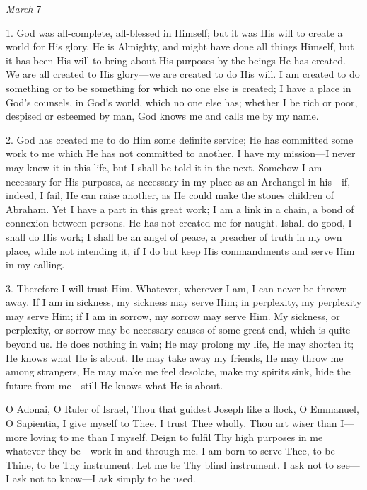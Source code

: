 
\emph{March}
7

1. God was all-complete,
all-blessed in Himself; but it was His will to create a world for His
glory. He is Almighty, and might have done all things Himself, but it
has been His will to bring about His purposes by the beings He has
created. We are all created to His glory—we are created to do
His will. I am created to do something or to be something for which no
one else is created; I have a place in God's counsels, in God's world,
which no one else has; whether I be rich or poor, despised or esteemed
by man, God knows me and calls me by my name.

2. God has created me to do Him
some definite service; He has committed some work to me which He has not
committed to another. I have my mission—I never may know it in this
life, but I shall be told it in the next. Somehow I am necessary for His
purposes, as necessary in my place as an Archangel in his—if, indeed,
I fail, He can raise another, as He could make the stones children of
Abraham. Yet I have a part in this great work; I am a link in a chain, a
bond of connexion between persons. He has not created me for naught. I\emph{}shall do good, I shall do His work; I shall be an angel of peace, a
preacher of truth in my own place, while not intending it, if I do but
keep His commandments and serve Him in my calling.

3. Therefore I will trust Him.
Whatever, wherever I am, I can never be thrown away. If I am in
sickness, my sickness may serve Him; in perplexity, my perplexity may
serve Him; if I am in sorrow, my sorrow may serve Him. My sickness, or
perplexity, or sorrow may be necessary causes of some great end, which
is quite beyond us. He does nothing in vain; He may prolong my life, He
may shorten it; He knows what He is about. He may take away my friends,
He may throw me among strangers, He may make me feel desolate,
make my spirits sink, hide the future from me—still He knows what He
is about.

O Adonai, O Ruler of Israel,
Thou that guidest Joseph like a flock, O Emmanuel, O Sapientia, I give
myself to Thee. I trust Thee wholly. Thou art wiser than I—more loving
to me than I myself. Deign to fulfil Thy high purposes in me whatever
they be—work in and through me. I am born to serve Thee, to be Thine,
to be Thy instrument. Let me be Thy blind instrument. I ask not to
see—I ask not to know—I ask simply to be used.


